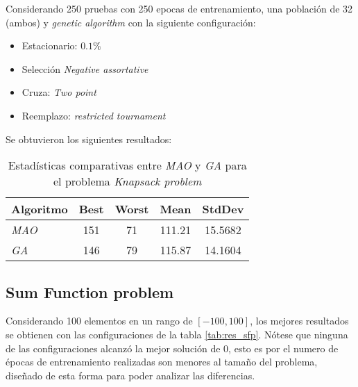 Considerando 250 pruebas con 250 epocas de entrenamiento, una población de 32 (ambos) y \textit{genetic algorithm} con la siguiente configuración:
\begin{itemize}[nosep]
	\item Estacionario: $0.1\%$
	\item Selección \textit{Negative assortative}
	\item Cruza: \textit{Two point}
	\item Reemplazo: \textit{restricted tournament}
\end{itemize}
Se obtuvieron los siguientes resultados:
\begin{table}[h!]
	\centering
	\begin{tabular}{|l|c|c|c|c|}
		\hline
		\textbf{Algoritmo} & \textbf{Best} & \textbf{Worst} & \textbf{Mean} & \textbf{StdDev} \\
		\hline
		\textit{MAO} & 151 & 71 & 111.21 & 15.5682 \\
		\textit{GA}  & 146 & 79 & 115.87 & 14.1604 \\
		\hline
	\end{tabular}
	\caption{Estadísticas comparativas entre \textit{MAO} y \textit{GA }para el problema \textit{Knapsack problem}}
	\label{tab:mao-ga-ksp}
\end{table}

\subsection{Sum Function problem}

Considerando 100 elementos en un rango de $[-100, 100]$, los mejores resultados se obtienen con las configuraciones de la tabla \ref{tab:res_sfp}. Nótese que ninguna de las configuraciones alcanzó la mejor solución de 0, esto es por el numero de épocas de entrenamiento realizadas son menores al tamaño del problema, diseñado de esta forma para poder analizar las diferencias.

